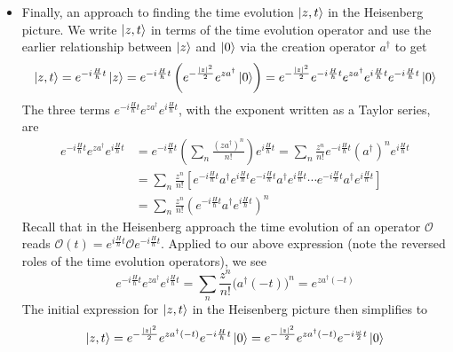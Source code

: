 \documentclass[11pt, a4paper]{article}
\newcommand{\tev}{e^{-i\frac{H}{\hbar}t}}  %
\newcommand{\tevp}{e^{i\frac{H}{\hbar}t}}  %
\begin{document}
\begin{itemize}
	\item Finally, an approach to finding the time evolution $ \ket{z, t} $ in the Heisenberg picture. We write $ \ket{z, t} $ in terms of the time evolution operator and use the earlier relationship between $ \ket{z} $ and $ \ket{0} $ via the creation operator $ a^{\dagger} $ to get
	\begin{equation*}
		\ket{z, t} = \tev \ket{z} = \tev\left( e^{-\frac{\abs{z}^{2}}{2}}e^{za^{\dagger}}\ket{0}\right) = e^{-\frac{\abs{z}^{2}}{2}}\tev e^{za^{\dagger}}\tevp \tev \ket{0}
	\end{equation*}
	The three terms $ \tev e^{za^{\dagger}} \tevp $, with the exponent written as a Taylor series, are
	\begin{align*}
		\tev e^{za^{\dagger}} \tevp &= \tev \left(\sum_{n}\frac{(za^{\dagger})^{n}}{n!}\right)\tevp = \sum_{n} \frac{z^{n}}{n!}\tev (a^{\dagger})^{n} \tevp\\
		&= \sum_{n}\frac{z^{n}}{n!}\left[\tev a^{\dagger}\tevp \tev a^{\dagger}\tevp \cdots \tev a^{\dagger}\tevp\right]\\
		&=\sum_{n}\frac{z^{n}}{n!}\left(\tev a^{\dagger}\tevp\right)^{n}
	\end{align*}
	Recall that in the Heisenberg approach the time evolution of an operator $ \mathcal{O} $ reads $  \mathcal{O}(t) = \tevp  \mathcal{O} \tev$. Applied to our above expression (note the reversed roles of the time evolution operators), we see
	\begin{equation*}
		\tev e^{za^{\dagger}} \tevp = \sum_{n}\frac{z^{n}}{n!}\big(a^{\dagger}(-t)\big)^{n} = e^{za^{\dagger}(-t)}
	\end{equation*}
	The initial expression for $ \ket{z, t} $ in the Heisenberg picture then simplifies to
	\begin{equation*}
		\ket{z, t} = e^{-\frac{\abs{z}^{2}}{2}}  e^{za^{\dagger}(-t)} \tev \ket{0} = e^{-\frac{\abs{z}^{2}}{2}}  e^{za^{\dagger}(-t)} e^{-i\frac{\omega}{2}t}\ket{0}
	\end{equation*}
	

\end{itemize}
\end{document}
